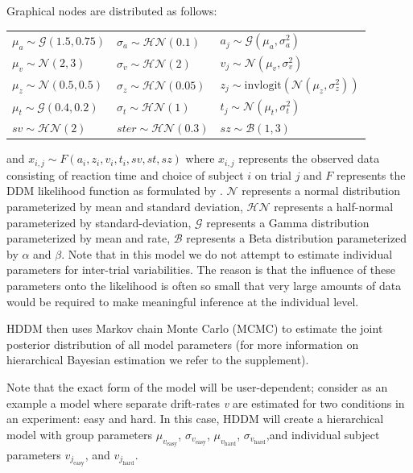 \documentclass[letterpaper,10pt,english]{article}
\begin{document}
Graphical nodes are distributed as follows:\\
\begin{center}
\begin{tabular}{l|l|l}
$\mu_{a} \sim \mathcal{G}(1.5, 0.75)$ & $\sigma_{a} \sim
\mathcal{HN}(0.1)$ & $a_{j} \sim \mathcal{G}(\mu_{a}, \sigma_{a}^2)$
\\
$\mu_{v} \sim \mathcal{N}(2, 3)$ & $\sigma_{v} \sim \mathcal{HN}(2)$ &
$v_{j} \sim \mathcal{N}(\mu_{v}, \sigma_{v}^2)$ \\

$\mu_{z} \sim \mathcal{N}(0.5, 0.5)$ & $\sigma_{z} \sim
\mathcal{HN}(0.05)$ & $z_{j} \sim \text{invlogit}(\mathcal{N}(\mu_{z},
\sigma_{z}^2))$ \\

$\mu_{t} \sim \mathcal{G}(0.4, 0.2)$ & $\sigma_{t} \sim
\mathcal{HN}(1)$ & $t_{j} \sim \mathcal{N}(\mu_{t}, \sigma_{t}^2)$\\

$sv \sim \mathcal{HN}(2)$ & $ster \sim \mathcal{HN}(0.3)$ & $sz \sim
\mathcal{B}(1, 3)$
\end{tabular}
\end{center}
and $x_{i, j} \sim F(a_{i}, z_{i}, v_{i}, t_{i}, sv, st, sz)$ where $x_{i, j}$ represents the observed data consisting of reaction time and choice of subject $i$ on trial $j$ and $F$ represents the DDM likelihood function as formulated by \citep{NavarroFuss09}. $\mathcal{N}$ represents a normal distribution parameterized by mean and standard deviation, $\mathcal{HN}$ represents a half-normal parameterized by standard-deviation, $\mathcal{G}$ represents a Gamma distribution parameterized by mean and rate, $\mathcal{B}$ represents a Beta distribution parameterized by $\alpha$ and $\beta$. Note that in this model we do not attempt to estimate individual parameters for inter-trial variabilities. The reason is that the influence of these parameters onto the likelihood is often so small that very large amounts of data would be required to make meaningful inference at the individual level.

HDDM then uses Markov chain Monte Carlo (MCMC) \citep{GamermanLopes06} to estimate the joint posterior distribution of all model parameters (for more information on hierarchical Bayesian estimation we refer to the supplement).

Note that the exact form of the model will be user-dependent; consider
as an example a model where separate drift-rates \emph{v} are
estimated for two conditions in an experiment: easy and hard. In this
case, HDDM will create a hierarchical model with group parameters
$\mu_{v_{\text{easy}}}$, $\sigma_{v_{\text{easy}}}$,
$\mu_{v_{\text{hard}}}$, $\sigma_{v_{\text{hard}}}$,and individual
subject parameters $v_{j_{\text{easy}}}$, and $v_{j_{\text{hard}}}$.
\end{document}

